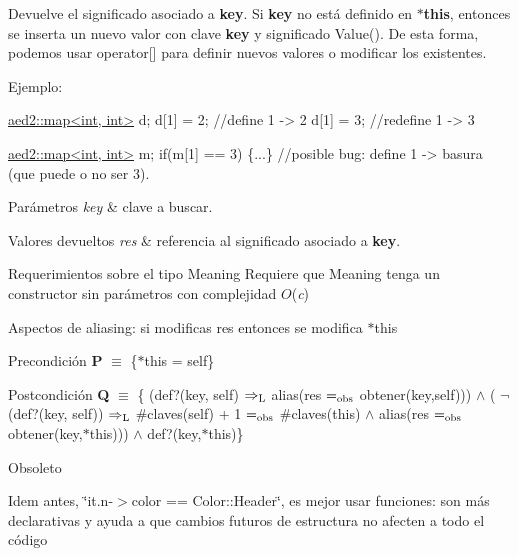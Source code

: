 Devuelve el significado asociado a {\bfseries key}. Si {\bfseries key} no está definido en {\bfseries $\ast$this}, entonces se inserta un nuevo valor con clave {\bfseries key} y significado Value(). De esta forma, podemos usar {\ttfamily operator\mbox{[}\mbox{]}} para definir nuevos valores o modificar los existentes.

Ejemplo\+: 
\begin{DoxyCode}
\hyperlink{classaed2_1_1map}{aed2::map<int, int>} d;
d[1] = 2;      \textcolor{comment}{//define 1 -> 2}
d[1] = 3;      \textcolor{comment}{//redefine 1 -> 3}

\hyperlink{classaed2_1_1map}{aed2::map<int, int>} m;
\textcolor{keywordflow}{if}(m[1] == 3) \{...\} \textcolor{comment}{//posible bug: define 1 -> basura (que puede o no ser 3).}
\end{DoxyCode}



\begin{DoxyParams}{Parámetros}
{\em key} & clave a buscar. \\
\hline
\end{DoxyParams}

\begin{DoxyRetVals}{Valores devueltos}
{\em res} & referencia al significado asociado a {\bfseries key}.\\
\hline
\end{DoxyRetVals}
\begin{DoxyParagraph}{Requerimientos sobre el tipo Meaning}
Requiere que Meaning tenga un constructor sin parámetros con complejidad $O$({\itshape c})
\end{DoxyParagraph}
\begin{DoxyParagraph}{Aspectos de aliasing\+:}
si modificas res entonces se modifica $\ast$this
\end{DoxyParagraph}
\begin{DoxyPrecond}{Precondición}
{\bfseries P} $\equiv$ \{$\ast$this = self\} 
\end{DoxyPrecond}
\begin{DoxyPostcond}{Postcondición}
{\bfseries Q} $\equiv$ \{ (def?(key, self) $\Rightarrow_{\rm L}$ alias(res $=_{\rm obs}$ obtener(key,self))) $\land$ ( $\lnot$(def?(key, self)) $\Rightarrow_{\rm L}$ \#claves(self) + 1 $=_{\rm obs}$ \#claves(this) $\land$ alias(res $=_{\rm obs}$ obtener(key,$\ast$this))) $\land$ def?(key,$\ast$this)\}
\end{DoxyPostcond}
\begin{DoxyRefDesc}{Obsoleto}
\item[\hyperlink{deprecated__deprecated000007}{Obsoleto}]Idem antes, \char`\"{}it.\+n-\/$>$color == Color\+::\+Header\char`\"{}, es mejor usar funciones\+: son más declarativas y ayuda a que cambios futuros de estructura no afecten a todo el código\end{DoxyRefDesc}



